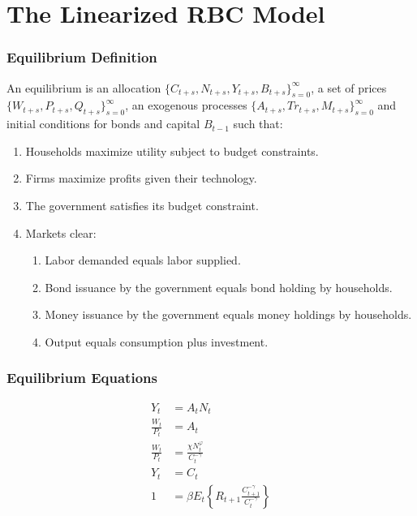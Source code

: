 \documentclass[english,xcolor=svgnames]{beamer}
\begin{document}
\section{The Linearized RBC Model}

\begin{frame}
\frametitle{Equilibrium Definition}
An equilibrium is an allocation $\{C_{t+s},N_{t+s},Y_{t+s},B_{t+s}\}_{s=0}^{\infty}$, a set of prices $\{W_{t+s},P_{t+s},Q_{t+s}\}_{s=0}^{\infty}$, an exogenous processes $\{A_{t+s},Tr_{t+s},M_{t+s}\}_{s=0}^{\infty}$ and initial conditions for bonds and capital $B_{t-1}$ such that:
\begin{enumerate}[1.]
	\item Households maximize utility subject to budget constraints.
	\item Firms maximize profits given their technology.
	\item The government satisfies its budget constraint.
	\item Markets clear:
	\begin{enumerate}[3.1.]
		\item Labor demanded equals labor supplied.
		\item Bond issuance by the government equals bond holding by households.
		\item Money issuance by the government equals money holdings by households.
		\item Output equals consumption plus investment.
	\end{enumerate}
\end{enumerate}
\end{frame}


\begin{frame}
\frametitle{Equilibrium Equations}
\begin{align*}
	Y_t&=A_tN_{t}  \\
	\frac{W_t}{P_t}&= A_t  \\
	\frac{W_t}{P_t}&=\frac{\chi N_t^\varphi}{C_t^{-\gamma}} \\
	Y_t&=C_t \\
	1&=\beta E_t\left\{R_{t+1} \frac{C_{t+1}^{-\gamma}}{C_{t}^{-\gamma}}\right\} 
\end{align*}
\end{frame}
\end{document}
